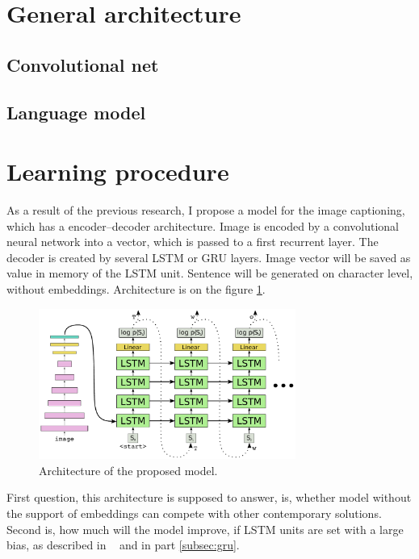 \section{General architecture}
\subsection{Convolutional net}
\subsection{Language model}
\section{Learning procedure}
As a result of the previous research, I propose a model for the image captioning, which has a encoder--decoder architecture. Image is encoded by a convolutional neural network into a vector, which is passed to a first recurrent layer. The decoder is created by several LSTM or GRU layers. Image vector will be saved as value in memory of the LSTM unit. Sentence will be generated on character level, without embeddings. Architecture is on the figure \ref{fig:proposedModel}.

\begin{figure}[!t]
	\centering
	\includegraphics[width=0.75\textwidth]{./fig/proposed-model.pdf}
	\caption{Architecture of the proposed model.
		\label{fig:proposedModel}}
\end{figure}

First question, this architecture is supposed to answer, is, whether model without the support of embeddings can compete with other contemporary solutions. Second is, how much will the model improve, if LSTM units are set with a large bias, as described in ~\cite{DBLP:conf/icml/JozefowiczZS15} and in part \ref{subsec:gru}.

